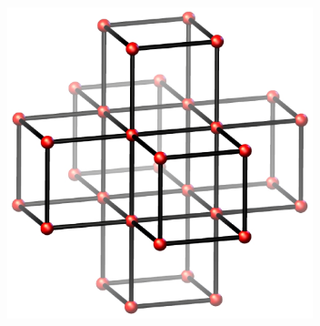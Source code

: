 \documentclass{beamer}
\begin{document}
\begin{frame}
  \begin{center}
    \includegraphics[width=3.5in]{PrimitiveCubic-net}
  \end{center}
\end{frame}
\end{document}
